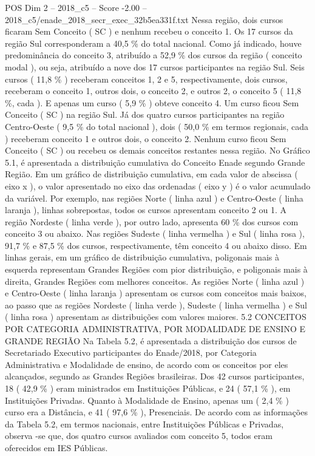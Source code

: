 \begin{textsample}{POS Dim 2 – 2018\_c5 – Score -2.00 – 2018\_c5/enade\_2018\_secr\_exec\_32b5ea331f.txt}
Nessa região, dois cursos ficaram Sem Conceito ( SC ) e nenhum recebeu o conceito 1.
Os 17 cursos da região Sul corresponderam a 40,5 \% do total nacional.
Como já indicado, houve predominância do conceito 3, atribuído a 52,9 \% dos cursos da região ( conceito modal ), ou seja, atribuído a nove dos 17 cursos participantes na região Sul.
Seis cursos ( 11,8 \% ) receberam conceitos 1, 2 e 5, respectivamente, dois cursos, receberam o conceito 1, outros dois, o conceito 2, e outros 2, o conceito 5 ( 11,8 \%, cada ).
E apenas um curso ( 5,9 \% ) obteve conceito 4.
Um curso ficou Sem Conceito ( SC ) na região Sul.
Já dos quatro cursos participantes na região Centro-Oeste ( 9,5 \% do total nacional ), dois ( 50,0 \% em termos regionais, cada ) receberam conceito 1 e outros dois, o conceito 2.
Nenhum curso ficou Sem Conceito ( SC ) ou recebeu os demais conceitos restantes nessa região.
No Gráfico 5.1, é apresentada a distribuição cumulativa do Conceito Enade segundo Grande Região.
Em um gráfico de distribuição cumulativa, em cada valor de abscissa ( eixo x ), o valor apresentado no eixo das ordenadas ( eixo y ) é o valor acumulado da variável.
Por exemplo, nas regiões Norte ( linha azul ) e Centro-Oeste ( linha laranja ), linhas sobrepostas, todos os cursos apresentam conceito 2 ou 1.
A região Nordeste ( linha verde ), por outro lado, apresenta 60 \% dos cursos com conceito 3 ou abaixo.
Nas regiões Sudeste ( linha vermelha ) e Sul ( linha rosa ), 91,7 \% e 87,5 \% dos cursos, respectivamente, têm conceito 4 ou abaixo disso.
Em linhas gerais, em um gráfico de distribuição cumulativa, poligonais mais à esquerda representam Grandes Regiões com pior distribuição, e poligonais mais à direita, Grandes Regiões com melhores conceitos.
As regiões Norte ( linha azul ) e Centro-Oeste ( linha laranja ) apresentam os cursos com conceitos mais baixos, ao passo que as regiões Nordeste ( linha verde ), Sudeste ( linha vermelha ) e Sul ( linha rosa ) apresentam as distribuições com valores maiores. 5.2 CONCEITOS POR CATEGORIA ADMINISTRATIVA, POR MODALIDADE DE ENSINO E GRANDE REGIÃO Na Tabela 5.2, é apresentada a distribuição dos cursos de Secretariado Executivo participantes do Enade/2018, por Categoria Administrativa e Modalidade de ensino, de acordo com os conceitos por eles alcançados, segundo as Grandes Regiões brasileiras.
Dos 42 cursos participantes, 18 ( 42,9 \% ) eram ministrados em Instituições Públicas, e 24 ( 57,1 \% ), em Instituições Privadas.
Quanto à Modalidade de Ensino, apenas um ( 2,4 \% ) curso era a Distância, e 41 ( 97,6 \% ), Presenciais.
De acordo com as informações da Tabela 5.2, em termos nacionais, entre Instituições Públicas e Privadas, observa -se que, dos quatro cursos avaliados com conceito 5, todos eram oferecidos em IES Públicas.

\end{textsample}
